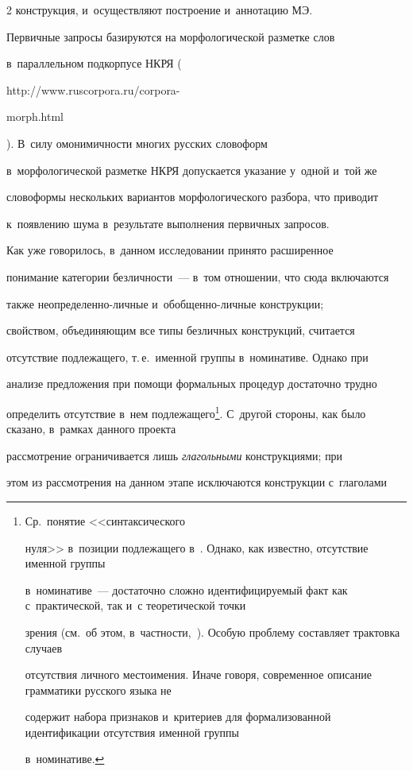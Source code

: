 \begin{multicols}{2}
конструкция, и~осуществляют построение и~аннотацию МЭ.

  

  Первичные запросы базируются на морфологической разметке слов 

в~параллельном подкорпусе НКРЯ ({\sf http://www.ruscorpora.ru/corpora-

morph.html}). В~силу омонимичности многих русских словоформ 

в~морфологической разметке НКРЯ допускается указание у~одной и~той же 

словоформы нескольких вариантов морфологического разбора, что приводит 

к~появлению шума в~результате выполнения первичных запросов.

  

  Как уже говорилось, в~данном исследовании принято расширенное 

понимание категории безличности~--- в~том отношении, что сюда включаются 

также неопределенно-личные и~обоб\-щен\-но-лич\-ные конструкции; 

свойством, объединяющим все типы безличных конструкций, считается 

отсутствие подлежащего, т.\,е.\ именной группы в~номинативе. Однако при 

анализе предложения при помощи формальных процедур достаточно трудно 

определить отсутствие в~нем подлежащего\footnote{Ср.\ понятие <<синтаксического 

нуля>> в~позиции подлежащего в~\cite{17-kr}. Однако, как известно, отсутствие именной группы 

в~номинативе~--- достаточно сложно идентифицируемый факт как с~практической, так и~с теоретической точки 

зрения (см.\ об этом, в~частности,~\cite{18-kr, 19-kr}). Особую проблему составляет трактовка случаев 

отсутствия личного местоимения. Иначе говоря, современное описание грамматики русского языка не 

содержит набора признаков и~критериев для формализованной идентификации отсутствия именной группы 

в~номинативе.}. С~другой стороны, как было сказано, в~рамках данного проекта 

рассмотрение ограничивается лишь \textit{глагольными} конструкциями; при 

этом из рассмотрения на данном этапе исключаются конструкции с~глаголами 


\end{multicols}
